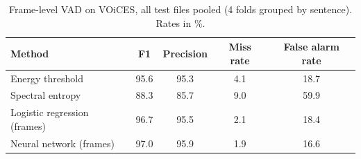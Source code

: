 \begin{table}[H]\centering\small\caption{Frame-level VAD on VOiCES, all test files pooled (4 folds grouped by sentence). Rates in \%.}\label{tab:vadv}
\begin{tabular}{lcccc}\toprule Method & F1 & Precision & Miss rate & False alarm rate\\\midrule
Energy threshold & 95.6 & 95.3 & 4.1 & 18.7\\
Spectral entropy & 88.3 & 85.7 & 9.0 & 59.9\\
Logistic regression (frames) & 96.7 & 95.5 & 2.1 & 18.4\\
Neural network (frames) & 97.0 & 95.9 & 1.9 & 16.6\\
\bottomrule\end{tabular}\end{table}
